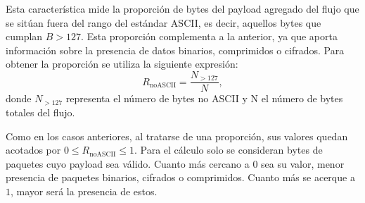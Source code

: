 Esta característica mide la proporción de bytes del payload agregado del flujo que se sitúan fuera del rango del estándar ASCII, es decir, aquellos bytes que cumplan $B > 127$. Esta proporción complementa a la anterior, ya que aporta información sobre la presencia de datos binarios, comprimidos o cifrados. Para obtener la proporción se utiliza la siguiente expresión:
\begin{equation}[EQ:RNONASCII]{}
R_{\text{noASCII}}=\frac{N_{>127}}{N},
\end{equation}donde $N_{>127}$ representa el número de bytes no ASCII y N el número de bytes totales del flujo.

Como en los casos anteriores, al tratarse de una proporción, sus valores quedan acotados por $0 \leq R_{\text{noASCII}} \leq 1$. Para el cálculo solo se consideran bytes de paquetes cuyo payload sea válido. Cuanto más cercano a $0$ sea su valor, menor presencia de paquetes binarios, cifrados o comprimidos. Cuanto más se acerque a $1$, mayor será la presencia de estos.

